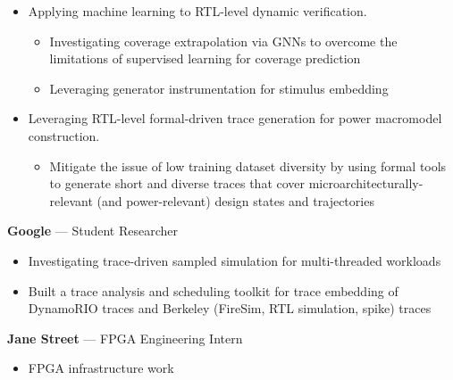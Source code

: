 \documentclass[10pt]{article}
\begin{document}
\begin{itemize}
\begin{itemize}
    \end{itemize}
    \item Applying machine learning to RTL-level dynamic verification.
    \begin{itemize}
        \item Investigating coverage extrapolation via GNNs to overcome the limitations of supervised learning for coverage prediction
        \item Leveraging generator instrumentation for stimulus embedding
    \end{itemize}
    \item Leveraging RTL-level formal-driven trace generation for power macromodel construction.
    \begin{itemize}
        \item Mitigate the issue of low training dataset diversity by using formal tools to generate short and diverse traces that cover microarchitecturally-relevant (and power-relevant) design states and trajectories
    \end{itemize}
\end{itemize}
\vspace{0.2cm}

 \textbf{Google} --- Student Researcher
\begin{itemize}
    \item Investigating trace-driven sampled simulation for multi-threaded workloads
    \item Built a trace analysis and scheduling toolkit for trace embedding of DynamoRIO traces and Berkeley (FireSim, RTL simulation, spike) traces
\end{itemize}
\vspace{0.2cm}

 \textbf{Jane Street} --- FPGA Engineering Intern
\begin{itemize}
    \item FPGA infrastructure work
\end{itemize}
\vspace{0.2cm}
\end{document}
